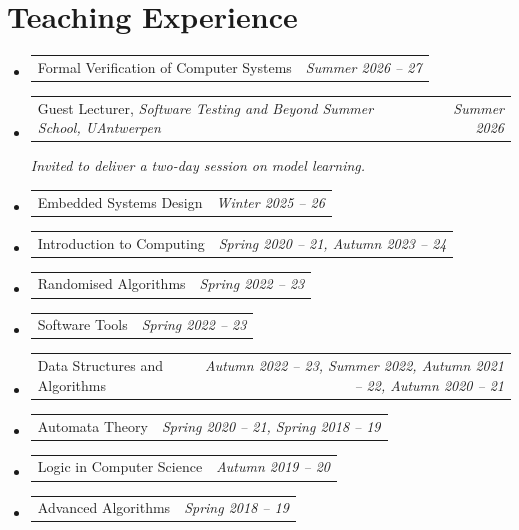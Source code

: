 \documentclass[a4paper,11pt]{article}
\makeatletter
\newcommand{\resumePoint}[2]{
\vspace{0.5mm}\item
    \begin{tabular*}{0.98\textwidth}[t]{l@{\extracolsep{\fill}}r}
        {\hspace{1mm}#1} & \textit{\footnotesize{#2}} \\
    \end{tabular*}
    \vspace{-2.4mm}
}
\newcommand{\resumeSubHeadingListStart}{\begin{itemize}[leftmargin=*,labelsep=0mm]}
\newcommand{\resumeSubHeadingListEnd}{\end{itemize}\vspace{2mm}}
\makeatother
\begin{document}

%
 
 
 \section{{\footnotesize \faMicrophone}\textbf{ Teaching Experience}}
  \resumeSubHeadingListStart
   \resumePoint{Formal Verification of Computer Systems}{Summer 2026 -- 27}
\resumePoint{Guest Lecturer, \textit{Software Testing and Beyond Summer School, UAntwerpen}}{Summer 2026}
  {\small\itshape Invited to deliver a two-day session on model learning.\par}
  \resumePoint{Embedded Systems Design}{Winter 2025 -- 26}
\resumePoint{Introduction to Computing}{Spring 2020 -- 21, Autumn 2023 -- 24}
\resumePoint{Randomised Algorithms}{Spring 2022 -- 23}
\resumePoint{Software Tools}{Spring 2022 -- 23}
\resumePoint{Data Structures and Algorithms}{Autumn 2022 -- 23, Summer 2022, Autumn 2021 -- 22, Autumn 2020 -- 21}
\resumePoint{Automata Theory}{Spring 2020 -- 21, Spring 2018 -- 19}
\resumePoint{Logic in Computer Science}{Autumn 2019 -- 20}
\resumePoint{Advanced Algorithms}{Spring 2018 -- 19}
 \resumeSubHeadingListEnd
 
 \vspace{-.45mm}
\end{document}
